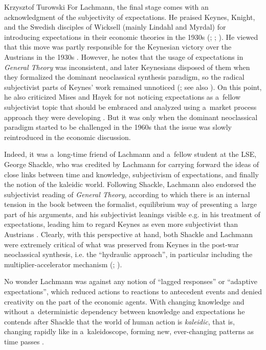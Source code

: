 \begin{artengenv}{Krzysztof Turowski}
For Lachmann, the final stage comes with an acknowledgment of the subjectivity of expectations. He praised Keynes, Knight, and the Swedish disciples of Wicksell (mainly Lindahl and Myrdal) for introducing expectations in their economic theories in the 1930s (\cite[141]{lachmann-notes}; \citeyear[157--158]{lachmann-individualism}; \citeyear[5]{lachmann-shackle-place}).
He viewed that this move was partly responsible for the Keynesian victory over the Austrians in the 1930s \parencite[see][10]{mittenmaier}.
However, he notes that the usage of expectations in \emph{General Theory} was inconsistent, and later Keynesians disposed of them when they formalized the dominant neoclassical synthesis paradigm, so the radical subjectivist parts of Keynes' work remained unnoticed (\cite[141--142]{lachmann-notes}; see also \cite[221]{lachmann-vicissitudes}).
On this point, he also criticized Mises and Hayek for not noticing expectations as a~fellow subjectivist topic that should be embraced and analyzed using a~market process approach they were developing \parencite[5]{lachmann-shackle-place}.
But it was only when the dominant neoclassical paradigm started to be challenged in the 1960s that the issue was slowly reintroduced in the economic discussion.

Indeed, it was a~long-time friend of Lachmann and a~fellow student at the LSE, George Shackle, who was credited by Lachmann for carrying forward the ideas of close links between time and knowledge, subjectivism of expectations, and finally the notion of the kaleidic world.
Following Shackle, Lachmann also endorsed the subjectivist reading of \emph{General Theory}, according to which there is an internal tension in the book between the formalist, equilibrium way of presenting a~large part of his arguments, and his subjectivist leanings visible e.g. in his treatment of expectations, leading him to regard Keynes as even more subjectivist than Austrians \parencite[281]{lachmann-hermeneutic}.
Clearly, with this perspective at hand, both Shackle and Lachmann were extremely critical of what was preserved from Keynes in the post-war neoclassical synthesis, i.e. the ``hydraulic approach'', in particular including the multiplier-accelerator mechanism (\cite[188]{lachmann-keynes}; \citeyear[149]{lachmann-hayek-sraffa}).

No wonder Lachmann was against any notion of ``lagged responses'' or ``adaptive expectations'', which reduced actions to reactions to antecedent events and denied creativity on the part of the economic agents.
With changing knowledge and without a~deterministic dependency between knowledge and expectations he contends after Shackle that the world of human action is \emph{kaleidic}, that is, changing rapidly like in a~kaleidoscope, forming new, ever-changing patterns as time passes \parencite[28--29]{lachmann1986market}.


\end{artengenv}
